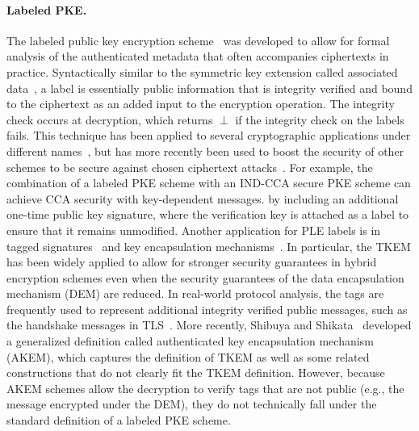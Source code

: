 \paragraph{Labeled PKE. }
The labeled public key encryption scheme~\cite{Shoup2001} was developed to allow for formal analysis of the authenticated metadata that often accompanies ciphertexts in practice.
Syntactically similar to the symmetric key extension called associated data~\cite{Rog02}, a label is essentially public information that is integrity
verified and bound to the ciphertext as an added input to the encryption operation.  The integrity check occurs at decryption, which returns $\perp$ if
the integrity check on the labels fails.  This technique has been applied to several cryptographic applications under different names~\cite{Lim1993,Camenisch2003}, but has more
recently been used to boost the security of other schemes to be secure against chosen ciphertext attacks~\cite{Shoup2002,Camenisch2009,Hofheinz2013,Libert2014}.  
For example, the combination of a labeled PKE scheme with an IND-CCA secure PKE scheme can achieve CCA security with key-dependent messages.  
by including an additional one-time public key signature, where the verification key is attached as a label to ensure that it remains unmodified.  Another application for PLE labels is
in tagged signatures~\cite{Abe2013} and key encapsulation mechanisms~\cite{AGK08}.  In particular, the TKEM has been widely applied to allow for stronger security guarantees
in hybrid encryption schemes even when the security guarantees of the data encapsulation mechanism (DEM) are reduced.  In real-world protocol analysis, the
tags are frequently used to represent additional integrity verified public messages, such as the handshake messages in TLS~\cite{Jonsson2002}.  
More recently, Shibuya and Shikata~\cite{Shibuya2011}
developed a generalized definition called authenticated key encapsulation mechanism (AKEM), which captures the definition of TKEM as well as some related
constructions that do not clearly fit the TKEM definition.  However, because AKEM schemes allow the decryption to verify tags that are not public (e.g., the message
encrypted under the DEM), they do not technically fall under the standard definition of a labeled PKE scheme.